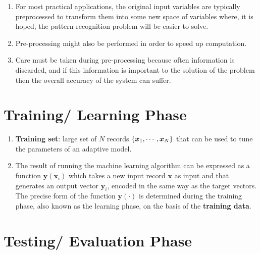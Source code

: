 \begin{enumerate}
    \item For most practical applications, the original input variables are typically preprocessed to transform them into some new space of variables where, it is hoped, the pattern recognition problem will be easier to solve.
    \hfill \cite{ml/book/Pattern-Recognition-And-Machine-Learning/Christopher-M-Bishop}

    \item Pre-processing might also be performed in order to speed up computation.
    \hfill \cite{ml/book/Pattern-Recognition-And-Machine-Learning/Christopher-M-Bishop}

    \item Care must be taken during pre-processing because often information is discarded, and if this information is important to the solution of the problem then the overall accuracy of the system can suffer.
    \hfill \cite{ml/book/Pattern-Recognition-And-Machine-Learning/Christopher-M-Bishop}
\end{enumerate}




\section{Training/ Learning Phase}

\begin{enumerate}
    \item \textbf{Training set}: large set of $N$ records $\left\{\bm{x}_1, \cdots , \bm{x}_N \right\}$ that can be used to tune the parameters of an adaptive model.
    \hfill \cite{ml/book/Pattern-Recognition-And-Machine-Learning/Christopher-M-Bishop}

    \item The result of running the machine learning algorithm can be expressed as a function $\bm{y}(\bm{x}_i)$ which takes a new input record $\bm{x}$ as input and that generates an output vector $\bm{y}_i$, encoded in the same way as the target vectors.
    The precise form of the function $\bm{y}(\cdot)$ is determined during the training phase, also known as the learning phase, on the basis of the \textbf{training data}.
    \hfill \cite{ml/book/Pattern-Recognition-And-Machine-Learning/Christopher-M-Bishop}
\end{enumerate}



\section{Testing/ Evaluation Phase}

